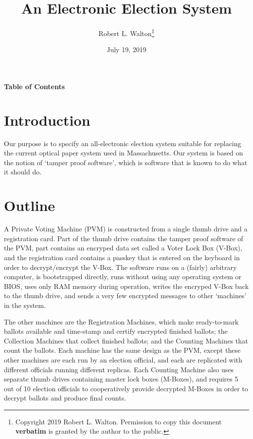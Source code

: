 \documentclass[12pt]{article}
\makeatletter
\renewcommand\tableofcontents{%
    \begin{list}{}%
	     {\setlength{\itemsep}{0in}%
	      \setlength{\topsep}{0in}%
	      \setlength{\parsep}{1ex}%
	      \setlength{\labelwidth}{0in}%
	      \setlength{\baselineskip}{1.5ex}%
	      \setlength{\leftmargin}{0.8in}%
	      \setlength{\rightmargin}{0.8in}}%
    \item\@starttoc{toc}%
    \end{list}}
\makeatother
\begin{document}
        
\title{An Electronic Election System}

\author{Robert L. Walton\thanks{Copyright 2019 Robert L. Walton.
Permission to copy this document {\bf verbatim} is granted by the author
to the public.}}

\date{July 19, 2019}

\maketitle

\begin{center}
\large \bf Table of Contents
\end{center}

\bigskip

\tableofcontents 

\newpage

\section{Introduction}

Our purpose is to specify an all-electronic election system
suitable for replacing the current optical paper system
used in Massachusetts.  Our system is based on the notion
of `tamper proof software', which is software that is
known to do what it should do.

\section{Outline}

A Private Voting Machine
(PVM) is constructed from a single thumb drive and a
registration card.  Part of the thumb drive contains the
tamper proof software of the PVM, part contains an encryped
data set called a Voter Lock Box (V-Box), and the registration
card contains a passkey that is entered on the keyboard in
order to decrypt/encrypt the V-Box.  The software runs on
a (fairly) arbitrary computer, is bootstrapped directly,
runs without using any operating system or BIOS,
uses only RAM memory during operation,
writes the encryped V-Box back to the thumb drive, and sends
a very few encrypted messages to other `machines' in the
system.

The other machines are the Registration Machines, which make
ready-to-mark ballots available and time-stamp and certify
encrypted finished ballots; the Collection Machines that collect
finished ballots; and the Counting Machines that count the
ballots.  Each machine has the same design as the PVM, except
these other machines are each run by an election official, and
each are replicated with different officials running different
replicas.  Each Counting Machine also uses separate
thumb drives containing master lock boxes
(M-Boxes), and requires 5 out of 10 election officials to cooperatively
provide decrypted M-Boxes in order to decrypt ballots and
produce final counts.
\end{document}
